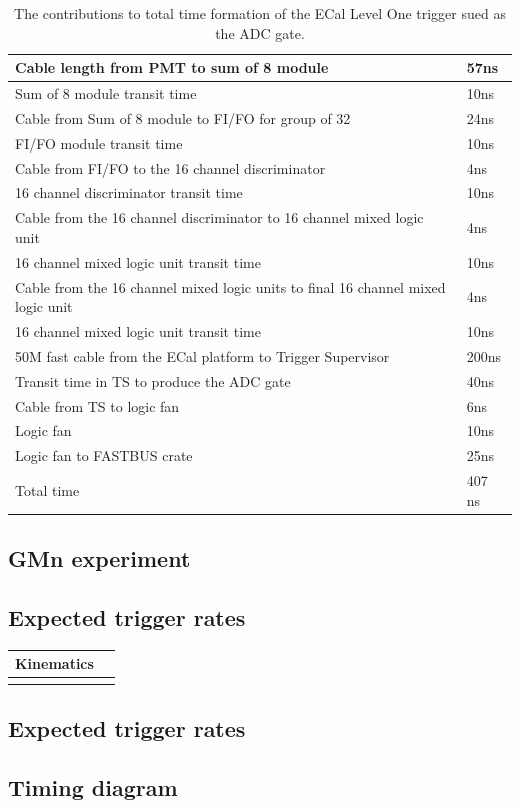 \documentclass{article}
\begin{document}
\begin{table}
 	\begin{tabular}{|l|l|} \hline
 		Cable length from PMT to sum of 8 module & 57ns \\ \hline
 		Sum of 8 module transit time & 10ns \\ \hline
 		Cable from Sum of 8 module to FI/FO for group of 32 & 24ns \\ \hline
 		FI/FO module transit time & 10ns \\ \hline
 		Cable from FI/FO to the 16 channel discriminator & 4ns \\ \hline
 		 16 channel discriminator  transit time & 10ns \\ \hline
 		 Cable from the 16 channel discriminator to 16 channel mixed logic unit& 4ns \\ \hline
  		 16 channel mixed logic unit  transit time & 10ns \\ \hline
  		 Cable from the 16 channel mixed logic units to final 16 channel mixed logic unit& 4ns \\ \hline
  		 16 channel mixed logic unit  transit time & 10ns \\ \hline
  		 50M fast cable from the ECal platform to Trigger Supervisor & 200ns \\ \hline
  		 Transit time in TS to produce the ADC gate & 40ns \\ \hline
  		 Cable from TS to logic fan  & 6ns \\ \hline\hline
                 Logic fan  & 10ns \\ \hline\hline
                 Logic fan to FASTBUS crate & 25ns \\ \hline\hline
  		 Total time & 407 ns \\ \hline  		   		  		 		 
 	\end{tabular}
 	\caption{The contributions to total time formation of the ECal Level One trigger sued as the ADC gate.}
 	\label{tab:ECALTrigtime}
\end{table}

\subsection{GMn experiment}
\subsection {Expected trigger rates}
\begin{tabular}{|c|c|}
  \hline
  Kinematics&\\
  \hline
  &\\
  \hline
\end{tabular}

\subsection {Expected trigger rates}
 
\subsection {Timing diagram}
\end{document}
